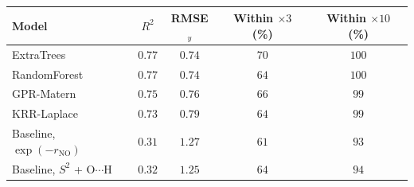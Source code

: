 \begin{tabular}{lcccc}
\toprule
Model & $R^2$ & RMSE$_y$ & Within $\times3$ (\%) & Within $\times10$ (\%)\\
\midrule
ExtraTrees & $0.77$ & $0.74$ & $70$ & $100$\\
RandomForest & $0.77$ & $0.74$ & $64$ & $100$\\
GPR-Matern & $0.75$ & $0.76$ & $66$ & $99$\\
KRR-Laplace & $0.73$ & $0.79$ & $64$ & $99$\\
Baseline, $\exp(-r_\mathrm{NO})$ & $0.31$ & $1.27$ & $61$ & $93$\\
Baseline, $S^2$ + O$\cdots$H & $0.32$ & $1.25$ & $64$ & $94$\\
\bottomrule
\end{tabular}
